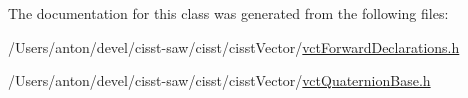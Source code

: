 The documentation for this class was generated from the following files\+:\begin{DoxyCompactItemize}
\item 
/\+Users/anton/devel/cisst-\/saw/cisst/cisst\+Vector/\hyperlink{vct_forward_declarations_8h}{vct\+Forward\+Declarations.\+h}\item 
/\+Users/anton/devel/cisst-\/saw/cisst/cisst\+Vector/\hyperlink{vct_quaternion_base_8h}{vct\+Quaternion\+Base.\+h}\end{DoxyCompactItemize}
